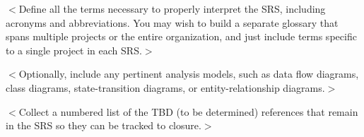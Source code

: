 \documentclass[a4paper, 11pt]{scrreprt}
\begin{document}
$<$Define all the terms necessary to properly interpret the SRS, including 
acronyms and abbreviations. You may wish to build a separate glossary that spans 
multiple projects or the entire organization, and just include terms specific to 
a single project in each SRS.$>$

$<$Optionally, include any pertinent analysis models, such as data flow 
diagrams, class diagrams, state-transition diagrams, or entity-relationship 
diagrams.$>$

$<$Collect a numbered list of the TBD (to be determined) references that remain 
in the SRS so they can be tracked to closure.$>$
\end{document}

